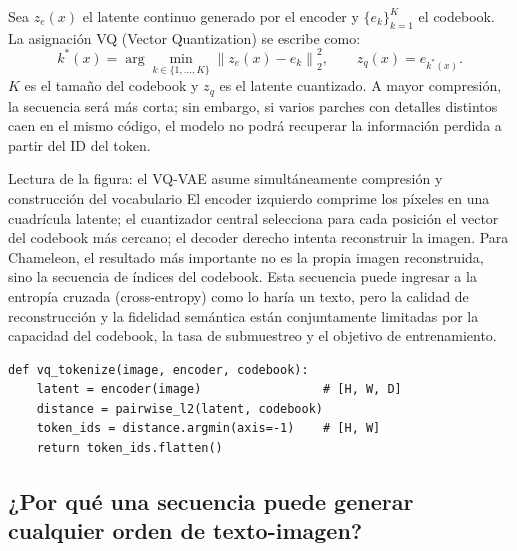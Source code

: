 Sea $z_e(x)$ el latente continuo generado por el encoder y $\{e_k\}_{k=1}^{K}$ el codebook. La asignación VQ (Vector Quantization) se escribe como:
$$
k^*(x)=\arg\min_{k\in\{1,\ldots,K\}}\left\|z_e(x)-e_k\right\|_2^2,
\qquad z_q(x)=e_{k^*(x)}.
$$
$K$ es el tamaño del codebook y $z_q$ es el latente cuantizado. A mayor compresión, la secuencia será más corta; sin embargo, si varios parches con detalles distintos caen en el mismo código, el modelo no podrá recuperar la información perdida a partir del ID del token.


\begin{knowledgebox}{Lectura de la figura: el VQ-VAE asume simultáneamente compresión y construcción del vocabulario}
El encoder izquierdo comprime los píxeles en una cuadrícula latente; el cuantizador central selecciona para cada posición el vector del codebook más cercano; el decoder derecho intenta reconstruir la imagen. Para Chameleon, el resultado más importante no es la propia imagen reconstruida, sino la secuencia de índices del codebook. Esta secuencia puede ingresar a la entropía cruzada (cross-entropy) como lo haría un texto, pero la calidad de reconstrucción y la fidelidad semántica están conjuntamente limitadas por la capacidad del codebook, la tasa de submuestreo y el objetivo de entrenamiento.
\end{knowledgebox}

\begin{lstlisting}[caption={Pseudocódigo mínimo para tokenización de imágenes VQ}]
def vq_tokenize(image, encoder, codebook):
    latent = encoder(image)                 # [H, W, D]
    distance = pairwise_l2(latent, codebook)
    token_ids = distance.argmin(axis=-1)    # [H, W]
    return token_ids.flatten()
\end{lstlisting}


\subsection{¿Por qué una secuencia puede generar cualquier orden de texto-imagen?}

